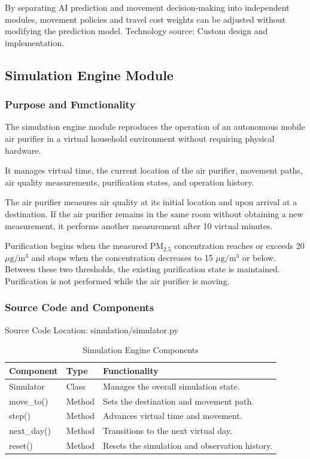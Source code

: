 \documentclass[conference]{IEEEtran}
\newlength{\tablebodywidth}
\newcommand{\pmfine}{\ensuremath{\mathrm{PM}_{2.5}}}
\newcommand{\pmunit}{\ensuremath{\mu\mathrm{g}/\mathrm{m}^3}}
\begin{document}
By separating AI prediction and movement decision-making into independent modules, movement policies and travel cost weights can be adjusted without modifying the prediction model. Technology source: Custom design and implementation.

\subsection{Simulation Engine Module}

\subsubsection{Purpose and Functionality}

The simulation engine module reproduces the operation of an autonomous mobile air purifier in a virtual household environment without requiring physical hardware.

It manages virtual time, the current location of the air purifier, movement paths, air quality measurements, purification states, and operation history.

The air purifier measures air quality at its initial location and upon arrival at a destination. If the air purifier remains in the same room without obtaining a new measurement, it performs another measurement after 10 virtual minutes.

Purification begins when the measured \pmfine{} concentration reaches or exceeds 20 \pmunit{} and stops when the concentration decreases to 15 \pmunit{} or below. Between these two thresholds, the existing purification state is maintained. Purification is not performed while the air purifier is moving.

\subsubsection{Source Code and Components}

Source Code Location: simulation/simulator.py

\begin{table}[!t]
\caption{Simulation Engine Components}
\label{tab:t15}
\centering\footnotesize
\setlength{\tabcolsep}{3pt}
\setlength{\tablebodywidth}{\dimexpr\columnwidth-18pt\relax}
\begin{tabular}{>{\raggedright\arraybackslash}p{0.370\tablebodywidth}>{\raggedright\arraybackslash}p{0.200\tablebodywidth}>{\raggedright\arraybackslash}p{0.430\tablebodywidth}}
\toprule
\textbf{Component} & \textbf{Type} & \textbf{Functionality} \\
\midrule
Simulator & Class & Manages the overall simulation state. \\
move\_\allowbreak{}to() & Method & Sets the destination and movement path. \\
step() & Method & Advances virtual time and movement. \\
next\_\allowbreak{}day() & Method & Transitions to the next virtual day. \\
reset() & Method & Resets the simulation and observation history. \\
\bottomrule
\end{tabular}
\end{table}
\end{document}
